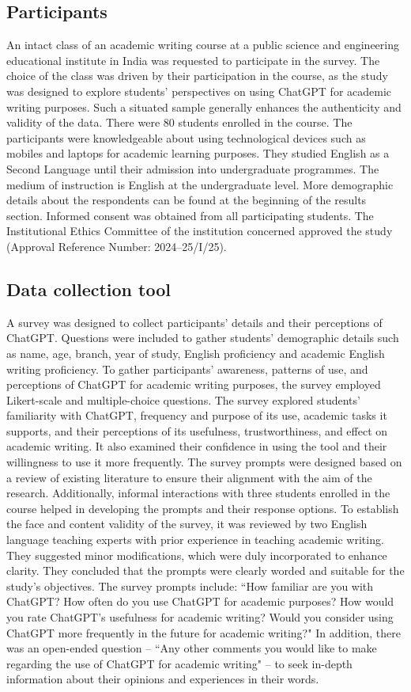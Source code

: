 \documentclass[english]{textolivre}
\begin{document}
\subsection{Participants}
An intact class of an academic writing course at a public science and engineering educational institute in India was requested to participate in the survey. The choice of the class was driven by their participation in the course, as the study was designed to explore students’ perspectives on using ChatGPT for academic writing purposes. Such a situated sample generally enhances the authenticity and validity of the data. There were 80 students enrolled in the course. The participants were knowledgeable about using technological devices such as mobiles and laptops for academic learning purposes. They studied English as a Second Language until their admission into undergraduate programmes. The medium of instruction is English at the undergraduate level. More demographic details about the respondents can be found at the beginning of the results section. Informed consent was obtained from all participating students. The Institutional Ethics Committee of the institution concerned approved the study (Approval Reference Number: 2024--25/I/25).

\subsection{Data collection tool}
A survey was designed to collect participants’ details and their perceptions of ChatGPT. Questions were included to gather students’ demographic details such as name, age, branch, year of study, English proficiency and academic English writing proficiency. To gather participants’ awareness, patterns of use, and perceptions of ChatGPT for academic writing purposes, the survey employed Likert-scale and multiple-choice questions. The survey explored students’ familiarity with ChatGPT, frequency and purpose of its use, academic tasks it supports, and their perceptions of its usefulness, trustworthiness, and effect on academic writing. It also examined their confidence in using the tool and their willingness to use it more frequently. The survey prompts were designed based on a review of existing literature to ensure their alignment with the aim of the research. Additionally, informal interactions with three students enrolled in the course helped in developing the prompts and their response options. To establish the face and content validity of the survey, it was reviewed by two English language teaching experts with prior experience in teaching academic writing. They suggested minor modifications, which were duly incorporated to enhance clarity. They concluded that the prompts were clearly worded and suitable for the study’s objectives. The survey prompts include: ``How familiar are you with ChatGPT? How often do you use ChatGPT for academic purposes? How would you rate ChatGPT’s usefulness for academic writing? Would you consider using ChatGPT more frequently in the future for academic writing?" In addition, there was an open-ended question -- ``Any other comments you would like to make regarding the use of ChatGPT for academic writing" – to seek in-depth information about their opinions and experiences in their words.
\end{document}
